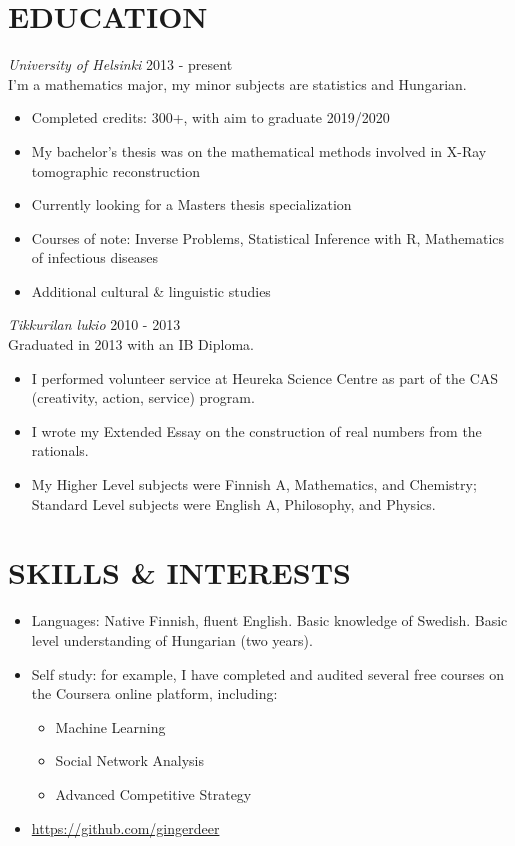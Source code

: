 \documentclass[margin, 10pt]{res} %
\begin{document}
\begin{resume}
\section{EDUCATION}

{\sl University of Helsinki} \hfill 2013 - present\\
I'm a mathematics major, my minor subjects are statistics and Hungarian.
\begin{itemize} \itemsep -2pt
\item Completed credits: 300+, with aim to graduate 2019/2020
\item My bachelor's thesis was on the mathematical methods involved in X-Ray tomographic reconstruction
\item Currently looking for a Masters thesis specialization
\item Courses of note: Inverse Problems, Statistical Inference with R, Mathematics of infectious diseases
\item Additional cultural \& linguistic studies
\end{itemize}
{\sl Tikkurilan lukio} \hfill 2010 - 2013\\
Graduated in 2013 with an IB Diploma.
\begin{itemize} \itemsep -2pt
\item I performed volunteer service at Heureka Science Centre as part of the CAS (creativity, action, service) program.
\item I wrote my Extended Essay on the construction of real numbers from the rationals.
\item My Higher Level subjects were Finnish A, Mathematics, and Chemistry; Standard Level subjects were English A, Philosophy, and Physics. 
\end{itemize}

\section{SKILLS \& INTERESTS}
\begin{itemize} \itemsep -2pt
\item Languages: Native Finnish, fluent English. Basic knowledge of Swedish. Basic level understanding of Hungarian (two years).
\item Self study: for example, I have completed and audited several free courses on the Coursera online platform, including:
  \begin{itemize} \itemsep -2pt
  \item Machine Learning
  \item Social Network Analysis
  \item Advanced Competitive Strategy
  \end{itemize}
\item \url{https://github.com/gingerdeer}

\end{itemize}


\end{resume}
\end{document}
